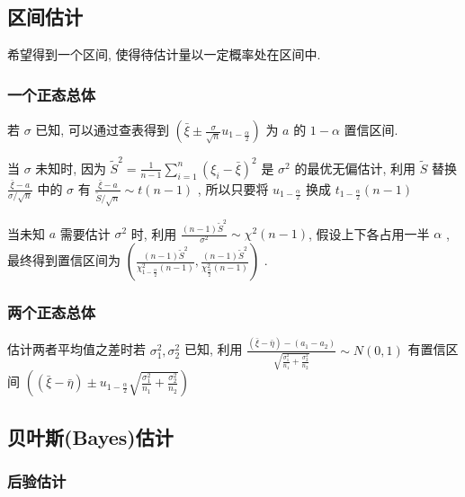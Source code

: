 \documentclass[10pt]{yerbaformat}
\begin{document}
\subsection{区间估计}

\par 希望得到一个区间, 使得待估计量以一定概率处在区间中.

\subsubsection{一个正态总体}

\par 若 $\sigma$ 已知, 可以通过查表得到 $\left(\bar{\xi} \pm \frac{\sigma}{\sqrt{n}} u_{1-\frac{\alpha}{2}}\right)$ 为 $a$ 的 $1-\alpha$ 置信区间.

\par 当 $\sigma$ 未知时, 因为 $\tilde{S}^{2}=\frac{1}{n-1} \sum_{i=1}^{n}\left(\xi_{i}-\bar{\xi}\right)^{2}$ 是 $\sigma^{2}$ 的最优无偏估计, 利用 $\tilde{S}$ 替换 $\frac{\bar{\xi}-a}{\sigma / \sqrt{n}}$ 中的 $\sigma$ 有 $\frac{\bar{\xi}-a}{\tilde{S} / \sqrt{n}} \sim t(n-1)$ , 所以只要将 $u_{1-\frac{\alpha}{2}}$ 换成 $t_{1-\frac{\alpha}{2}}(n-1)$

\par 当未知 $a$ 需要估计 $\sigma^2$ 时, 利用 $\frac{(n-1) \tilde{S}^{2}}{\sigma^{2}} \sim \chi^{2}(n-1)$, 假设上下各占用一半 $\alpha$ , 最终得到置信区间为 $\left(\frac{(n-1) \tilde{S}^{2}}{\chi_{1-\frac{\alpha}{2}}^{2}(n-1)}, \frac{(n-1) \tilde{S}^{2}}{\chi_{\frac{\alpha}{2}}^{2}(n-1)}\right)$ .

\subsubsection{两个正态总体}
\par 估计两者平均值之差时若 $\sigma_{1}^{2}, \sigma_{2}^{2}$ 已知, 利用 $\frac{(\bar{\xi}-\bar{\eta})-\left(a_{1}-a_{2}\right)}{\sqrt{\frac{\sigma_{1}^{2}}{n_{1}}+\frac{\sigma_{2}^{2}}{n_{2}}}} \sim N(0,1)$ 有置信区间 $\left((\bar{\xi}-\bar{\eta}) \pm u_{1-\frac{\alpha}{2}} \sqrt{\frac{\sigma_{1}^{2}}{n_{1}}+\frac{\sigma_{2}^{2}}{n_{2}}}\right)$

\subsection{贝叶斯(Bayes)估计}

\subsubsection{后验估计}
\end{document}
